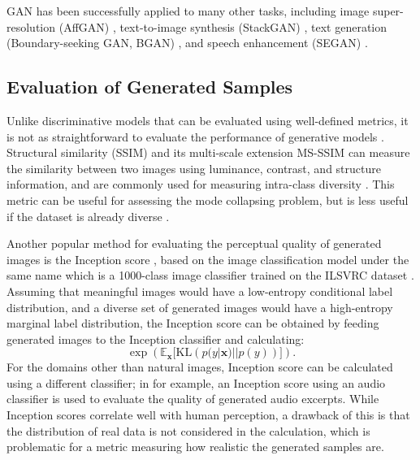 GAN has been successfully applied to many other tasks, including image super-resolution (AffGAN) \cite{sonderby2016amortised}, text-to-image synthesis (StackGAN) \cite{zhang2017stackgan,zhang2017stackgan2}, text generation (Boundary-seeking GAN, BGAN) \cite{hjelm2018bsgan}, and speech enhancement (SEGAN) \cite{pascual2017segan}.


\subsection{Evaluation of Generated Samples}

Unlike discriminative models that can be evaluated using well-defined metrics, it is not as straightforward to evaluate the performance of generative models \cite{theis2015evaluation}.
Structural similarity (SSIM) \cite{wang2004ssim} and its multi-scale extension MS-SSIM \cite{wang2003msssim} can measure the similarity between two images using luminance, contrast, and structure information, and are commonly used for measuring intra-class diversity \cite{odena2016acgan}.
This metric can be useful for assessing the mode collapsing problem, but is less useful if the dataset is already diverse \cite{fedus2018equilibrium}.

Another popular method for evaluating the perceptual quality of generated images is the Inception score \cite{salimans2016improved}, based on the image classification model under the same name \cite{szegedy2015inception} which is a 1000-class image classifier trained on the ILSVRC dataset \cite{russakovsky2015imagenet}.
Assuming that meaningful images would have a low-entropy conditional label distribution, and a diverse set of generated images would have a high-entropy marginal label distribution, the Inception score can be obtained by feeding generated images to the Inception classifier and calculating:
\begin{equation}\label{eqn:inception}
\exp \left ( \mathbb{E}_{\bm{x}} \Big[ \textrm{KL} \left ( p(y|\bm{x}) || p(y) \right ) \Big] \right ).
\end{equation}
For the domains other than natural images, Inception score can be calculated using a different classifier; in \cite{donahue2018wavegan} for example, an Inception score using an audio classifier is used to evaluate the quality of generated audio excerpts.
While Inception scores correlate well with human perception, a drawback of this is that the distribution of real data is not considered in the calculation, which is problematic for a metric measuring how realistic the generated samples are.

